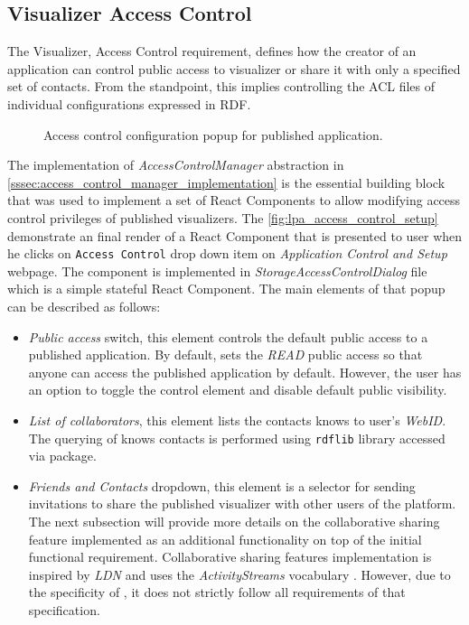 \subsection{Visualizer Access Control}

The Visualizer, Access Control requirement, defines how the creator of an application can control public access to visualizer or share it with only a specified set of contacts. From the \lpas{} standpoint, this implies controlling the ACL files of individual \lpa{} configurations expressed in RDF.

\begin{figure}[h]
\centering
{}
\caption{Access control configuration popup for published application.}
\label{fig:lpa_access_control_setup}
\end{figure}

The implementation of \textit{AccessControlManager} abstraction in \autoref{sssec:access_control_manager_implementation} is the essential building block that was used to implement a set of React Components to allow modifying access control privileges of published visualizers. The \autoref{fig:lpa_access_control_setup} demonstrate an final render of a React Component that is presented to user when he clicks on \texttt{Access Control} drop down item on \textit{Application Control and Setup} webpage. The component is implemented in \textit{StorageAccessControlDialog} file which is a simple stateful React Component. The main elements of that popup can be described as follows:
\begin{itemize}
    \item \textit{Public access} switch, this element controls the default public access to a published application. By default, \lpa{} sets the \textit{READ} public access so that anyone can access the published application by default. However, the user has an option to toggle the control element and disable default public visibility. 
    \item \textit{List of collaborators}, this element lists the contacts knows to user's \textit{WebID}. The querying of knows contacts is performed using \texttt{rdflib} library accessed via \lpas{} package. 
    \item \textit{Friends and Contacts} dropdown, this element is a selector for sending invitations to share the published visualizer with other users of the platform. The next subsection will provide more details on the collaborative sharing feature implemented as an additional functionality on top of the initial functional requirement. Collaborative sharing features implementation is inspired by \textit{\gls{LDN}} \cite{ldn} and uses the \textit{ActivityStreams} vocabulary \cite{activitystreams}. However, due to the specificity of \lpa{}, it does not strictly follow all requirements of that specification. 
\end{itemize}

